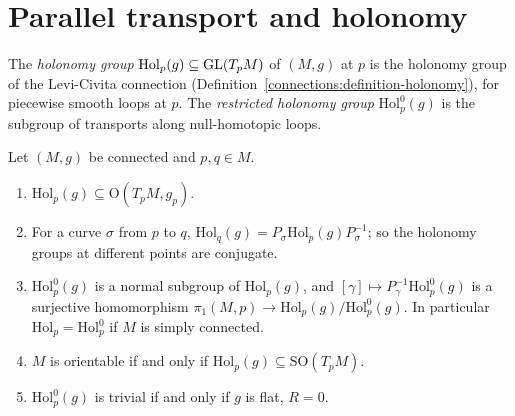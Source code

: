 \section{Parallel transport and holonomy}\label{riemannian-geometry:section-holonomy}

The \emph{holonomy group} $\mathrm{Hol}_p(g) \subseteq \mathrm{GL}(T_pM)$ of $(M, g)$ at $p$ is the holonomy group of the Levi-Civita connection (Definition~\ref{connections:definition-holonomy}), for piecewise smooth loops at $p$. The
\emph{restricted holonomy group} $\mathrm{Hol}^0_p(g)$ is the subgroup of transports along null-homotopic loops.

\begin{proposition}\label{riemannian-geometry:proposition-holonomy-basic}
Let $(M, g)$ be connected and $p, q \in M$.
\begin{enumerate}
\item $\mathrm{Hol}_p(g) \subseteq \mathrm{O}(T_pM, g_p)$.
\item For a curve $\sigma$ from $p$ to $q$, $\mathrm{Hol}_q(g) = P_\sigma\mathrm{Hol}_p(g)P_\sigma^{-1}$; so the holonomy groups at different points are conjugate.
\item $\mathrm{Hol}^0_p(g)$ is a normal subgroup of $\mathrm{Hol}_p(g)$, and $[\gamma] \mapsto P_\gamma^{-1}\mathrm{Hol}^0_p(g)$ is a surjective homomorphism $\pi_1(M, p) \to \mathrm{Hol}_p(g)/\mathrm{Hol}^0_p(g)$. In particular
$\mathrm{Hol}_p = \mathrm{Hol}^0_p$ if $M$ is simply connected.
\item $M$ is orientable if and only if $\mathrm{Hol}_p(g) \subseteq \mathrm{SO}(T_pM)$.
\item $\mathrm{Hol}^0_p(g)$ is trivial if and only if $g$ is flat, $R = 0$.
\end{enumerate}
\end{proposition}

